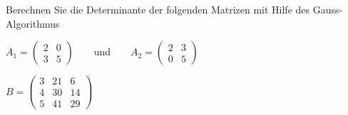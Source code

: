 Berechnen Sie die Determinante der folgenden Matrizen mit Hilfe des
Gauss-Algorithmus
\begin{teilaufgaben}
\item
$
\displaystyle
A_1 = \begin{pmatrix}2&0\\3&5\end{pmatrix}
\qquad\text{und}\qquad
A_2 = \begin{pmatrix}2&3\\0&5\end{pmatrix}
$
\item
$\displaystyle
B=\begin{pmatrix}
3&21& 6\\
4&30&14\\
5&41&29
\end{pmatrix}$
\end{teilaufgaben}


